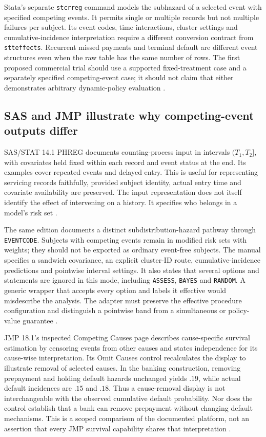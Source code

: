 Stata's separate \texttt{stcrreg} command models the subhazard of a selected
event with specified competing events. It permits single or multiple records
but not multiple failures per subject. Its event codes, time interactions,
cluster settings and cumulative-incidence interpretation require a different
conversion contract from \texttt{stteffects}. Recurrent missed payments and
terminal default are different event structures even when the raw table has
the same number of rows. The first proposed commercial trial should use a
supported fixed-treatment case and a separately specified competing-event
case; it should not claim that either demonstrates arbitrary dynamic-policy
evaluation \citep{exec14_survival_stata_competing}.

\subsection{SAS and JMP illustrate why competing-event outputs differ}

SAS/STAT 14.1 PHREG documents counting-process input in intervals $(T_1,T_2]$,
with covariates held fixed within each record and event status at the end.
Its examples cover repeated events and delayed entry. This is useful for
representing servicing records faithfully, provided subject identity, actual
entry time and covariate availability are preserved. The input representation
does not itself identify the effect of intervening on a history. It specifies
who belongs in a model's risk set \citep{exec14_survival_sas}.

The same edition documents a distinct subdistribution-hazard pathway through
\texttt{EVENTCODE}. Subjects with competing events remain in modified risk
sets with weights; they should not be exported as ordinary event-free subjects.
The manual specifies a sandwich covariance, an explicit cluster-ID route,
cumulative-incidence predictions and pointwise interval settings. It also
states that several options and statements are ignored in this mode, including
\texttt{ASSESS}, \texttt{BAYES} and \texttt{RANDOM}. A generic wrapper that
accepts every option and labels it effective would misdescribe the analysis.
The adapter must preserve the effective procedure configuration and distinguish
a pointwise band from a simultaneous or policy-value guarantee
\citep{exec14_survival_sas}.

JMP 18.1's inspected Competing Causes page describes cause-specific survival
estimation by censoring events from other causes and states independence for
its cause-wise interpretation. Its Omit Causes control recalculates the
display to illustrate removal of selected causes. In the banking construction,
removing prepayment and holding default hazards unchanged yields $.19$, while
actual default incidences are $.15$ and $.18$. Thus a cause-removal display
is not interchangeable with the observed cumulative default probability.
Nor does the control establish that a bank can remove prepayment without
changing default mechanisms. This is a scoped comparison of the documented
platform, not an assertion that every JMP survival capability shares that
interpretation \citep{exec14_survival_jmp,exec14_survival_exact}.

